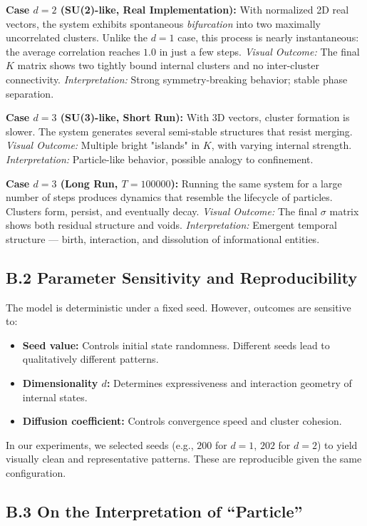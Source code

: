 \documentclass[12pt]{article}
\begin{document}
\textbf{Case $d=2$ (SU(2)-like, Real Implementation):}  
With normalized 2D real vectors, the system exhibits spontaneous \textit{bifurcation} into two maximally uncorrelated clusters. Unlike the $d=1$ case, this process is nearly instantaneous: the average correlation reaches $1.0$ in just a few steps.  
\textit{Visual Outcome:} The final $K$ matrix shows two tightly bound internal clusters and no inter-cluster connectivity.  
\textit{Interpretation:} Strong symmetry-breaking behavior; stable phase separation.

\textbf{Case $d=3$ (SU(3)-like, Short Run):}  
With 3D vectors, cluster formation is slower. The system generates several semi-stable structures that resist merging.  
\textit{Visual Outcome:} Multiple bright "islands" in $K$, with varying internal strength.  
\textit{Interpretation:} Particle-like behavior, possible analogy to confinement.

\textbf{Case $d=3$ (Long Run, $T=100000$):}  
Running the same system for a large number of steps produces dynamics that resemble the lifecycle of particles. Clusters form, persist, and eventually decay.  
\textit{Visual Outcome:} The final $\sigma$ matrix shows both residual structure and voids.  
\textit{Interpretation:} Emergent temporal structure — birth, interaction, and dissolution of informational entities.

\subsection*{B.2 Parameter Sensitivity and Reproducibility}

The model is deterministic under a fixed seed. However, outcomes are sensitive to:
\begin{itemize}
    \item \textbf{Seed value:} Controls initial state randomness. Different seeds lead to qualitatively different patterns.
    \item \textbf{Dimensionality $d$:} Determines expressiveness and interaction geometry of internal states.
    \item \textbf{Diffusion coefficient:} Controls convergence speed and cluster cohesion.
\end{itemize}

In our experiments, we selected seeds (e.g., $200$ for $d=1$, $202$ for $d=2$) to yield visually clean and representative patterns. These are reproducible given the same configuration.

\subsection*{B.3 On the Interpretation of “Particle”}
\end{document}
